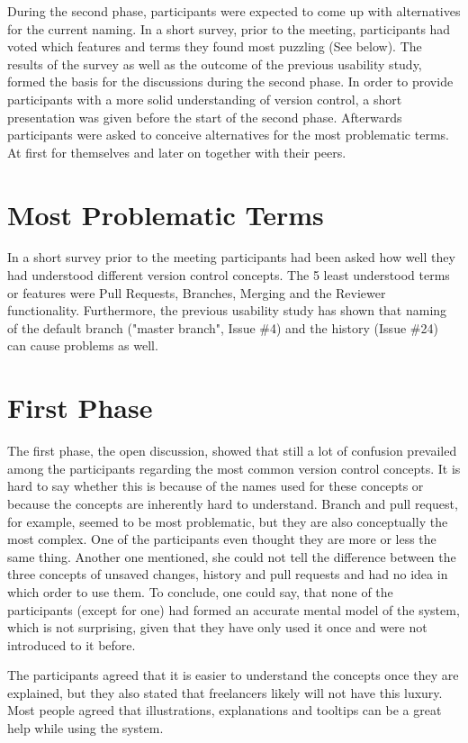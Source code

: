 During the second phase, participants were expected to come up with alternatives for the current naming. In a short survey, prior to the meeting, participants had voted which features and terms they found most puzzling (See below). The results of the survey as well as the outcome of the previous usability study, formed the basis for the discussions during the second phase. In order to provide participants with a more solid understanding of version control, a short presentation was given before the start of the second phase. Afterwards participants were asked to conceive alternatives for the most problematic terms. At first for themselves and later on together with their peers.

\section{Most Problematic Terms}
In a short survey prior to the meeting participants had been asked how well they had understood different version control concepts. The 5 least understood terms or features were Pull Requests, Branches, Merging and the Reviewer functionality. Furthermore, the previous usability study has shown that naming of the default branch ("master branch", Issue \#4) and the history (Issue \#24) can cause problems as well.

\section{First Phase}
The first phase, the open discussion, showed that still a lot of confusion prevailed among the participants regarding the most common version control concepts. It is hard to say whether this is because of the names used for these concepts or because the concepts are inherently hard to understand. Branch and pull request, for example, seemed to be most problematic, but they are also conceptually the most complex. One of the participants even thought they are more or less the same thing. Another one mentioned, she could not tell the difference between the three concepts of unsaved changes, history and pull requests and had no idea in which order to use them. To conclude, one could say, that none of the participants (except for one) had formed an accurate mental model of the system, which is not surprising, given that they have only used it once and were not introduced to it before.

The participants agreed that it is easier to understand the concepts once they are explained, but they also stated that freelancers likely will not have this luxury. Most people agreed that illustrations, explanations and tooltips can be a great help while using the system.

